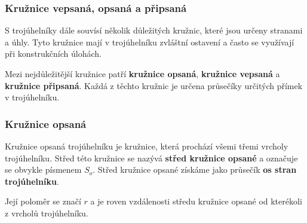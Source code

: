 \documentclass[12pt,a4paper]{article}
\begin{document}
\subsubsection*{Kružnice vepsaná, opsaná a připsaná}

S trojúhelníky dále souvísí několik důležitých kružnic, které jsou určeny stranami a úhly.
Tyto kružnice mají v trojúhelníku zvláštní ostavení a často se využívají při konstrukčních úlohách.

Mezi nejdůležitější kružnice patří \textbf{kružnice opsaná}, \textbf{kružnice vepsaná} a \textbf{kružnice připsaná}.
Každá z těchto kružnic je určena průsečíky určitých přímek v trojúhelníku.

\subsubsection*{Kružnice opsaná}

Kružnice opsaná trojúhelníku je kružnice, která prochází všemi třemi vrcholy trojúhelníku.
Střed této kružnice se nazývá \textbf{střed kružnice opsané} a označuje se obvykle písmenem $S_o$.
Střed kružnice opsané získáme jako průsečík \textbf{os stran trojúhelníku}.

Její poloměr se značí $r$ a je roven vzdálenosti středu kružnice opsané od kterékoli z vrcholů trojúhelníku.

\begin{center}
\end{center}
\end{document}
